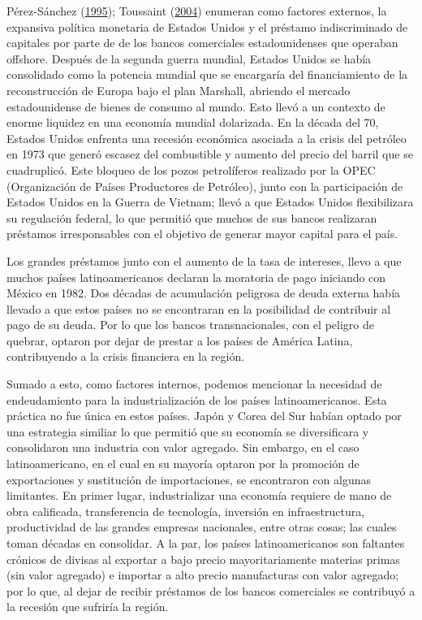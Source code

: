 \documentclass[
  letterpaper,
  12pt,
  oneside,
  spanish,
  doublespacing,
  headsepline,
  parskip]{MastersDoctoralThesis}
\begin{document}
Pérez-Sánchez (\protect\hyperlink{ref-puxe9rez-suxe1nchez1995}{1995});
Toussaint (\protect\hyperlink{ref-toussaint2004}{2004}) enumeran como
factores externos, la expansiva política monetaria de Estados Unidos y
el préstamo indiscriminado de capitales por parte de de los bancos
comerciales estadounidenses que operaban offshore. Después de la segunda
guerra mundial, Estados Unidos se había consolidado como la potencia
mundial que se encargaría del financiamiento de la reconstrucción de
Europa bajo el plan Marshall, abriendo el mercado estadounidense de
bienes de consumo al mundo. Esto llevó a un contexto de enorme liquidez
en una economía mundial dolarizada. En la década del 70, Estados Unidos
enfrenta una recesión económica asociada a la crisis del petróleo en
1973 que generó escasez del combustible y aumento del precio del barril
que se cuadruplicó. Este bloqueo de los pozos petrolíferos realizado por
la OPEC (Organización de Países Productores de Petróleo), junto con la
participación de Estados Unidos en la Guerra de Vietnam; llevó a que
Estados Unidos flexibilizara su regulación federal, lo que permitió que
muchos de sus bancos realizaran préstamos irresponsables con el objetivo
de generar mayor capital para el país.

Los grandes préstamos junto con el aumento de la tasa de intereses,
llevo a que muchos países latinoamericanos declaran la moratoria de pago
iniciando con México en 1982. Dos décadas de acumulación peligrosa de
deuda externa había llevado a que estos países no se encontraran en la
posibilidad de contribuir al pago de su deuda. Por lo que los bancos
transnacionales, con el peligro de quebrar, optaron por dejar de prestar
a los países de América Latina, contribuyendo a la crisis financiera en
la región.

Sumado a esto, como factores internos, podemos mencionar la necesidad de
endeudamiento para la industrialización de los países latinoamericanos.
Esta práctica no fue única en estos países. Japón y Corea del Sur habían
optado por una estrategia similiar lo que permitió que su economía se
diversificara y consolidaron una industria con valor agregado. Sin
embargo, en el caso latinoamericano, en el cual en su mayoría optaron
por la promoción de exportaciones y sustitución de importaciones, se
encontraron con algunas limitantes. En primer lugar, industrializar una
economía requiere de mano de obra calificada, transferencia de
tecnología, inversión en infraestructura, productividad de las grandes
empresas nacionales, entre otras cosas; las cuales toman décadas en
consolidar. A la par, los países latinoamericanos son faltantes crónicos
de divisas al exportar a bajo precio mayoritariamente materias primas
(sin valor agregado) e importar a alto precio manufacturas con valor
agregado; por lo que, al dejar de recibir préstamos de los bancos
comerciales se contribuyó a la recesión que sufriría la región.
\end{document}
